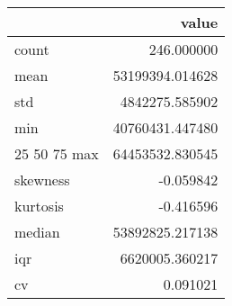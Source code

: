 \begin{tabular}{lr}
\toprule
 & value \\
\midrule
count & 246.000000 \\
mean & 53199394.014628 \\
std & 4842275.585902 \\
min & 40760431.447480 \\
25%
50%
75%
max & 64453532.830545 \\
skewness & -0.059842 \\
kurtosis & -0.416596 \\
median & 53892825.217138 \\
iqr & 6620005.360217 \\
cv & 0.091021 \\
\bottomrule
\end{tabular}
